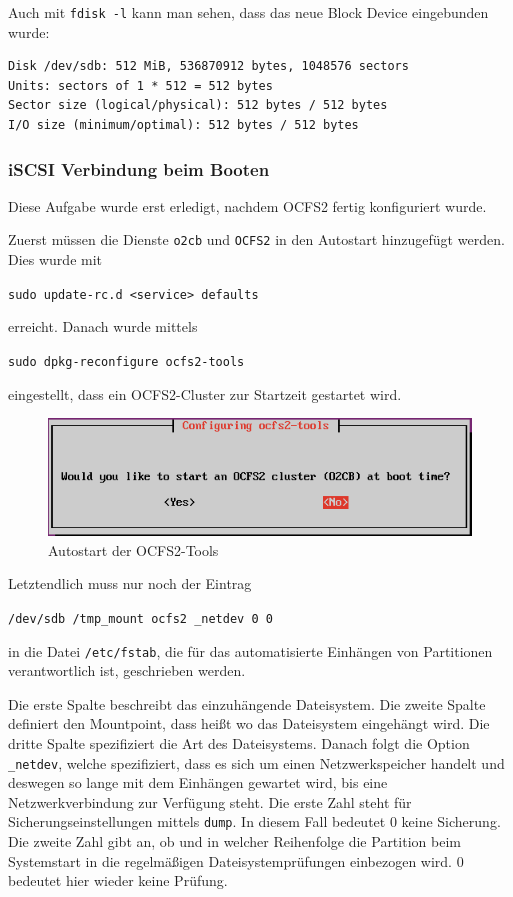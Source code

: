 Auch mit \texttt{fdisk -l} kann man sehen, dass das neue Block Device eingebunden wurde:
\begin{lstlisting}[style=bash, caption=\texttt{fdisk -l}]
Disk /dev/sdb: 512 MiB, 536870912 bytes, 1048576 sectors
Units: sectors of 1 * 512 = 512 bytes
Sector size (logical/physical): 512 bytes / 512 bytes
I/O size (minimum/optimal): 512 bytes / 512 bytes
\end{lstlisting}
\subsubsection{iSCSI Verbindung beim Booten}
Diese Aufgabe wurde erst erledigt, nachdem OCFS2 fertig konfiguriert wurde.

Zuerst müssen die Dienste \texttt{o2cb} und \texttt{OCFS2} in den Autostart hinzugefügt werden. Dies wurde mit 

\texttt{sudo update-rc.d <service> defaults}

erreicht. \cite{updaterc}
Danach wurde mittels

\texttt{sudo dpkg-reconfigure ocfs2-tools}

eingestellt, dass ein OCFS2-Cluster zur Startzeit gestartet wird.

\begin{figure}[!h]
	\begin{center}
		\includegraphics[width=0.7\linewidth]{images/boot.png}
		\caption{Autostart der OCFS2-Tools}
		\label{boot}
	\end{center}
\end{figure}

Letztendlich muss nur noch der Eintrag

\texttt{/dev/sdb	/tmp\_mount	ocfs2	\_netdev		0	0}

in die Datei \texttt{/etc/fstab}, die für das automatisierte Einhängen von Partitionen verantwortlich ist, geschrieben werden. \cite{ocfs2faq}

Die erste Spalte beschreibt das einzuhängende Dateisystem. Die zweite Spalte definiert den Mountpoint, dass heißt wo das Dateisystem eingehängt wird. Die dritte Spalte spezifiziert die Art des Dateisystems. Danach folgt die Option \texttt{\_netdev}, welche spezifiziert, dass es sich um einen Netzwerkspeicher handelt und deswegen so lange mit dem Einhängen gewartet wird, bis eine Netzwerkverbindung zur Verfügung steht. Die erste Zahl steht für Sicherungseinstellungen mittels \texttt{dump}. In diesem Fall bedeutet 0 keine Sicherung. Die zweite Zahl gibt an, ob und in welcher Reihenfolge die Partition beim Systemstart in die regelmäßigen Dateisystemprüfungen einbezogen wird. 0 bedeutet hier wieder keine Prüfung. \cite{ubuntuusersfstab}

